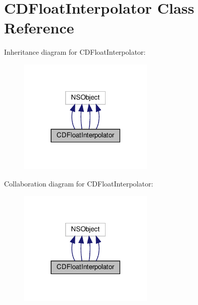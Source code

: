 \hypertarget{interfaceCDFloatInterpolator}{}\section{C\+D\+Float\+Interpolator Class Reference}
\label{interfaceCDFloatInterpolator}


Inheritance diagram for C\+D\+Float\+Interpolator\+:
\nopagebreak
\begin{figure}[H]
\begin{center}
\leavevmode
\includegraphics[width=182pt]{interfaceCDFloatInterpolator__inherit__graph}
\end{center}
\end{figure}


Collaboration diagram for C\+D\+Float\+Interpolator\+:
\nopagebreak
\begin{figure}[H]
\begin{center}
\leavevmode
\includegraphics[width=182pt]{interfaceCDFloatInterpolator__coll__graph}
\end{center}
\end{figure}
